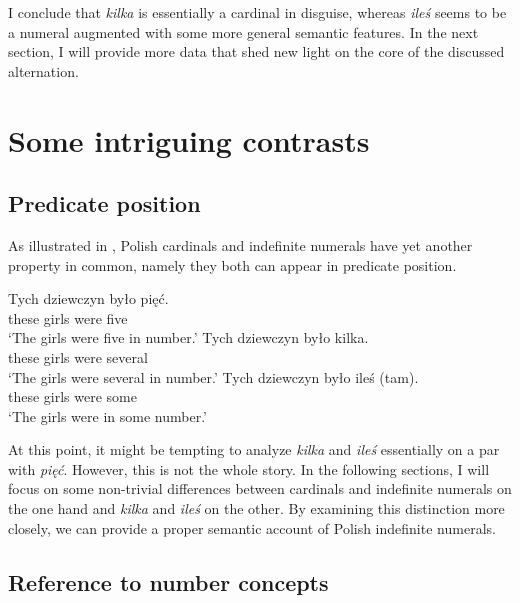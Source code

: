 \documentclass[output=paper,
]{langscibook}
\begin{document}
	I conclude that \textit{kilka} is essentially a cardinal in disguise, whereas \textit{ileś} seems to be a numeral augmented with some more general semantic features. In the next section, I will provide more data that shed new light on the core of the discussed alternation.
	
	\section{Some intriguing contrasts}\label{sec:some-intriguing-contrasts}
	
	\subsection{Predicate position}\label{sec:predicate-position}
	
	 As illustrated in , Polish cardinals and indefinite numerals have yet another property in common, namely they both can appear in predicate position.
	
	\ea \label{ex:predicate-position} \ea \gll Tych dziewczyn było pięć.\\
	these girls were five\\
	\glt `The girls were five in number.'
	\ex \gll Tych dziewczyn było kilka.\\
	these girls were several\\
	\glt `The girls were several in number.'
	\ex \gll Tych dziewczyn było {ileś (tam)}.\\
	these girls were some\\
	\glt `The girls were in some number.'
	\z
    \z

	\noindent At this point, it might be tempting to analyze \textit{kilka} and \textit{ileś} essentially on a par with \textit{pięć}. However, this is not the whole story. In the following sections, I will focus on some non-trivial differences between cardinals and indefinite numerals on the one hand and \textit{kilka} and \textit{ileś} on the other. By examining this distinction more closely, we can provide a proper semantic account of Polish indefinite numerals. 
	
	\subsection{Reference to number concepts}\label{sec:reference-to-number-concepts}
	
\end{document}
